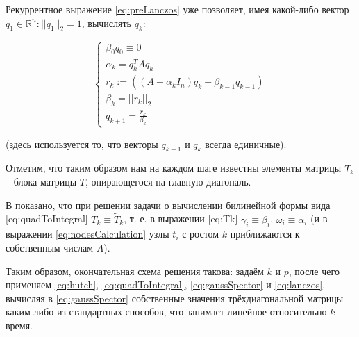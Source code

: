 Рекуррентное выражение \eqref{eq:preLanczos} уже позволяет, имея какой-либо вектор $ q_1 \in \mathds R^n: ||q_1||_2 = 1 $, вычислять $ q_k $:

\begin{equation}\label{eq:lanczos}
    \begin{cases}
        \beta_0 q_0 \equiv 0 \\
        \alpha_k = q_k^T Aq_k \\
        r_k := \left( (A-\alpha_k I_n)q_k - \beta_{k-1} q_{k-1} \right) \\
        \beta_k = || r_k ||_2 \\
        q_{k+1} = \frac{r_k}{\beta_k}
    \end{cases}
\end{equation}

(здесь используется то, что векторы $ q_{k-1} $ и $ q_k $ всегда единичные).

Отметим, что таким образом нам на каждом шаге известны элементы матрицы $ \tilde T_k $ -- блока матрицы $ T $, опирающегося на главную диагональ.

В \cite{golub2013matcomput} показано, что при решении задачи о вычислении билинейной формы вида \eqref{eq:quadToIntegral} $ T_k \equiv \tilde T_k $, т. е. в выражении \eqref{eq:Tk} $ \gamma_i \equiv \beta_i $, $ \omega_i \equiv \alpha_i $ (и в выражении \eqref{eq:nodesCalculation} узлы $ t_i $ с ростом $ k $ приближаются к собственным числам $ A $).

Таким образом, окончательная схема решения такова: задаём $ k $ и $ p $, после чего применяем \eqref{eq:hutch}, \eqref{eq:quadToIntegral}, \eqref{eq:gaussSpector} и \eqref{eq:lanczos}, вычисляя в \eqref{eq:gaussSpector} собственные значения трёхдиагональной матрицы каким-либо из стандартных способов, что занимает линейное относительно $ k $ время. %
